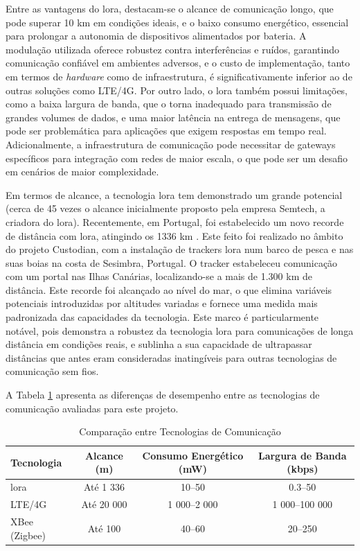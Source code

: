 Entre as vantagens do \gls{lora}, destacam-se o alcance de comunicação longo, que pode superar 10 km em condições ideais, e o baixo consumo energético, essencial para prolongar a autonomia de dispositivos alimentados por bateria. A modulação utilizada oferece robustez contra interferências e ruídos, garantindo comunicação confiável em ambientes adversos, e o custo de implementação, tanto em termos de \emph{hardware} como de infraestrutura, é significativamente inferior ao de outras soluções como LTE/4G. Por outro lado, o \gls{lora} também possui limitações, como a baixa largura de banda, que o torna inadequado para transmissão de grandes volumes de dados, e uma maior latência na entrega de mensagens, que pode ser problemática para aplicações que exigem respostas em tempo real. Adicionalmente, a infraestrutura de comunicação pode necessitar de gateways específicos para integração com redes de maior escala, o que pode ser um desafio em cenários de maior complexidade.

Em termos de alcance, a tecnologia \gls{lora} tem demonstrado um grande potencial (cerca de 45 vezes o alcance inicialmente proposto pela empresa Semtech, a criadora do \gls{lora}). Recentemente, em Portugal, foi estabelecido um novo recorde de distância com \gls{lora}, atingindo os 1336 km \cite{pplware-lora}. Este feito foi realizado no âmbito do projeto Custodian, com a instalação de trackers \gls{lora} num barco de pesca e nas suas boias na costa de Sesimbra, Portugal. O tracker estabeleceu comunicação com um portal nas Ilhas Canárias, localizando-se a mais de 1.300 km de distância. Este recorde foi alcançado ao nível do mar, o que elimina variáveis potenciais introduzidas por altitudes variadas e fornece uma medida mais padronizada das capacidades da tecnologia. Este marco é particularmente notável, pois demonstra a robustez da tecnologia \gls{lora} para comunicações de longa distância em condições reais, e sublinha a sua capacidade de ultrapassar distâncias que antes eram consideradas inatingíveis para outras tecnologias de comunicação sem fios.

A Tabela \ref{tab:comparacao_comunicacao} apresenta as diferenças de desempenho entre as tecnologias de comunicação avaliadas para este projeto.

\begin{table}[H]
    \centering
    \caption{Comparação entre Tecnologias de Comunicação}
    \label{tab:comparacao_comunicacao}
    \begin{tabular}{lccc}
        \textbf{Tecnologia} & \textbf{Alcance (m)} & \textbf{Consumo Energético (mW)} & \textbf{Largura de Banda (kbps)} \\ \hline 
        \gls{lora} & Até 1 336 & 10--50 & 0.3--50 \\ 
        LTE/4G & Até 20 000 & 1 000--2 000 & 1 000--100 000 \\ 
        XBee (Zigbee) & Até 100 & 40--60 & 20--250 \\
        \hline 
    \end{tabular}%
\end{table}

